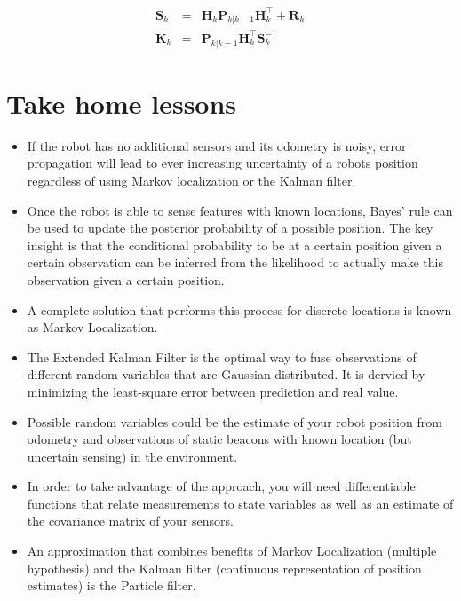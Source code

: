 \begin{eqnarray}
\boldsymbol{S}_{k}&=&{\boldsymbol{H}_{k}}\boldsymbol{P}_{k|k-1}{\boldsymbol{H}_{k}^\top}+\boldsymbol{R}_{k}\\
\boldsymbol{K}_{k}&=&\boldsymbol{P}_{k|k-1}{\boldsymbol{H}_{k}^\top}\boldsymbol{S}_{k}^{-1}
\end{eqnarray}

\section*{Take home lessons}
\begin{itemize}
\item If the robot has no additional sensors and its odometry is noisy, error propagation will lead to ever increasing uncertainty of a robots position regardless of using Markov localization or the Kalman filter.
\item Once the robot is able to sense features with known locations, Bayes' rule can be used to update the posterior probability of a possible position. The key insight is that the conditional probability to be at a certain position given a certain observation can be inferred from the likelihood to actually make this observation given a certain position.
\item A complete solution that performs this process for discrete locations is known as Markov Localization. 
\item The Extended Kalman Filter is the optimal way to fuse observations of different random variables that are Gaussian distributed.
It is dervied by minimizing the least-square error between prediction and real value.
\item Possible random variables could be the estimate of your robot position from odometry and observations of static beacons with known location (but uncertain sensing) in the environment.
\item In order to take advantage of the approach, you will need differentiable functions that relate measurements to state variables as well as an estimate of the covariance matrix of your sensors.
\item An approximation that combines benefits of Markov Localization (multiple hypothesis) and the Kalman filter (continuous representation of position estimates) is the Particle filter.
\end{itemize}

